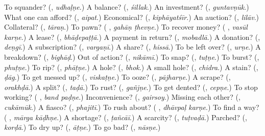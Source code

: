 \begin{tcolorbox}[breakable,colback=teal!4,colframe=teal!35!black,title={Before you move on}]
To squander? (\textbf{}, \emph{udhaḷṇe}.) A balance? (\textbf{}, \emph{śillak}.) An investment? (\textbf{}, \emph{guntavṇūk}.) What one can afford? (\textbf{}, \emph{aipat}.) Economical? (\textbf{}, \emph{kiphāyatśīr}.) An auction? (\textbf{}, \emph{lilāv}.) Collateral? (\textbf{}, \emph{tāraṇ}.) To pawn? (\textbf{ }, \emph{gahāṇ ṭhevṇe}.) To recover money? (\textbf{ }, \emph{vasūl karṇe}.) A lease? (\textbf{}, \emph{bhāḍepaṭṭā}.) A payment in return? (\textbf{}, \emph{mobadlā}.) A donation? (\textbf{}, \emph{deṇgī}.) A subscription? (\textbf{}, \emph{vargaṇī}.) A share? (\textbf{}, \emph{hissā}.) To be left over? (\textbf{}, \emph{urṇe}.) A breakdown? (\textbf{}, \emph{bighāḍ}.) Out of action? (\textbf{}, \emph{nikāmī}.) To snap? (\textbf{}, \emph{tuṭṇe}.) To burst? (\textbf{}, \emph{phuṭṇe}.) To rip? (\textbf{}, \emph{phāṭṇe}.) A hole? (\textbf{}, \emph{bhok}.) A small hole? (\textbf{}, \emph{chidra}.) A stain? (\textbf{}, \emph{ḍāg}.) To get messed up? (\textbf{}, \emph{viskaṭṇe}.) To ooze? (\textbf{}, \emph{pājharṇe}.) A scrape? (\textbf{}, \emph{orakhḍā}.) A split? (\textbf{}, \emph{taḍā}.) To rust? (\textbf{}, \emph{gañjṇe}.) To get dented? (\textbf{}, \emph{cepṇe}.) To stop working? (\textbf{ }, \emph{band paḍṇe}.) Inconvenience? (\textbf{}, \emph{gairsoy}.) Missing each other? (\textbf{}, \emph{cukāmūk}.) A fiasco? (\textbf{}, \emph{phajitī}.) To rush about? (\textbf{ }, \emph{dhāvpaḷ karṇe}.) To find a way? (\textbf{ }, \emph{mārga kāḍhṇe}.) A shortage? (\textbf{}, \emph{ṭañcāī}.) A scarcity? (\textbf{}, \emph{tuṭvaḍā}.) Parched? (\textbf{}, \emph{korḍā}.) To dry up? (\textbf{}, \emph{āṭṇe}.) To go bad? (\textbf{}, \emph{nāsṇe}.)
\end{tcolorbox}
